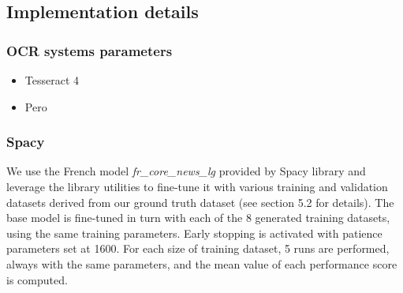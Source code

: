  
 




\subsection{Implementation details}

\subsubsection{OCR systems parameters}
\begin{itemize}
    \item Tesseract 4
    \item Pero
\end{itemize}

\subsubsection{Spacy}
We use the French model \textit{fr\_core\_news\_lg} provided by Spacy library and leverage the library utilities to fine-tune it with various training and validation datasets derived from our ground truth dataset (see section 5.2 for details). The base model is fine-tuned in turn with each of the 8 generated training datasets, using the same training parameters. Early stopping is activated with patience parameters set at 1600. For each size of training dataset, 5 runs are performed, always with the same parameters, and the mean value of each performance score is computed.

